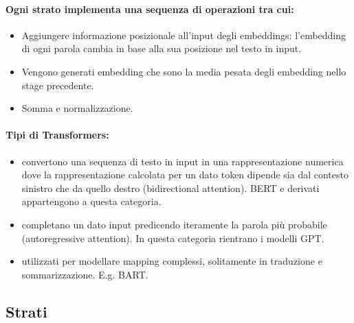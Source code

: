 \paragraph{Ogni strato implementa una sequenza di operazioni tra cui:}

\begin{itemize}
  \item Aggiungere informazione posizionale all'input degli embeddings: l'embedding di ogni parola cambia in base alla sua posizione nel testo in input.
  \item {} Vengono generati embedding che sono la media pesata degli embedding nello stage precedente. 
  \item Somma e normalizzazione.
\end{itemize}

\paragraph{Tipi di Transformers:}

\begin{itemize}
  \item {} convertono una sequenza di testo in input in una rappresentazione numerica dove la rappresentazione calcolata per un dato token dipende sia dal contesto sinistro che da quello destro (bidirectional attention). BERT e derivati appartengono a questa categoria. 
  \item {} completano un dato input predicendo iteramente la parola più probabile (autoregressive attention). In questa categoria rientrano i modelli GPT. 
  \item {} utilizzati per modellare mapping complessi, solitamente in traduzione e sommarizzazione. E.g. BART.
\end{itemize}

\subsection{Strati}


